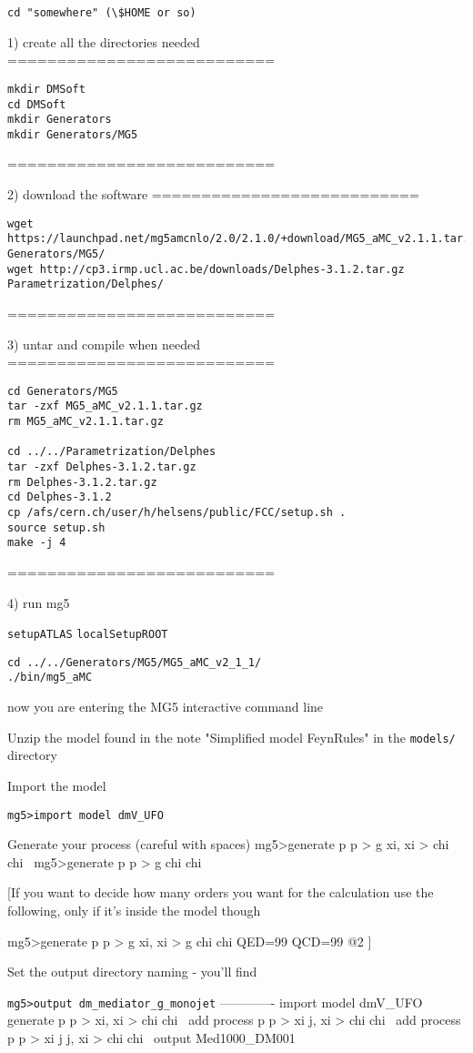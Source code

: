 \lstinline|cd "somewhere" (\$HOME or so)|

1) create all the directories needed
===========================
\begin{lstlisting}
mkdir DMSoft
cd DMSoft
mkdir Generators
mkdir Generators/MG5
\end{lstlisting}
===========================

2) download the software
===========================
\begin{lstlisting}
wget https://launchpad.net/mg5amcnlo/2.0/2.1.0/+download/MG5_aMC_v2.1.1.tar.gz Generators/MG5/
wget http://cp3.irmp.ucl.ac.be/downloads/Delphes-3.1.2.tar.gz Parametrization/Delphes/
\end{lstlisting}
===========================          


3) untar and compile when needed
===========================
\begin{lstlisting}
cd Generators/MG5
tar -zxf MG5_aMC_v2.1.1.tar.gz 
rm MG5_aMC_v2.1.1.tar.gz 

cd ../../Parametrization/Delphes
tar -zxf Delphes-3.1.2.tar.gz
rm Delphes-3.1.2.tar.gz
cd Delphes-3.1.2
cp /afs/cern.ch/user/h/helsens/public/FCC/setup.sh .
source setup.sh
make -j 4
\end{lstlisting}
===========================


4) run mg5

\lstinline|setupATLAS|
\lstinline|localSetupROOT|

\begin{lstlisting}
cd ../../Generators/MG5/MG5_aMC_v2_1_1/
./bin/mg5_aMC
\end{lstlisting}
now you are entering the MG5 interactive command line

Unzip the model found in the note "Simplified model FeynRules" in the \lstinline|models/| directory 

Import the model

\lstinline|mg5>import model dmV_UFO|

Generate your process (careful with spaces)
mg5>generate p p > g xi, xi > chi chi~
mg5>generate p p > g chi chi~

[If you want to decide how many orders you want for the calculation use the following, only if it's inside the model though

mg5>generate p p > g xi, xi > g chi chi QED=99 QCD=99 @2 ]

Set the output directory naming - you'll find

\lstinline|mg5>output dm_mediator_g_monojet|
-------------
import model dmV_UFO
generate p p > xi, xi > chi chi~
add process p p > xi j, xi > chi chi~
add process p p > xi j j, xi > chi chi~
output Med1000_DM001

